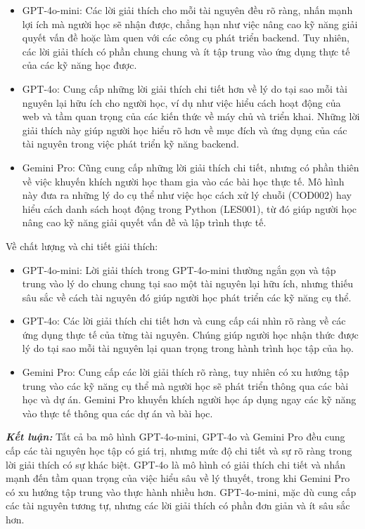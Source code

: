 \begin{itemize}
    \item GPT-4o-mini: Các lời giải thích cho mỗi tài nguyên đều rõ ràng, nhấn mạnh lợi ích mà người học sẽ nhận được, chẳng hạn như việc nâng cao kỹ năng giải quyết vấn đề hoặc làm quen với các công cụ phát triển backend. Tuy nhiên, các lời giải thích có phần chung chung và ít tập trung vào ứng dụng thực tế của các kỹ năng học được.
    \item GPT-4o: Cung cấp những lời giải thích chi tiết hơn về lý do tại sao mỗi tài nguyên lại hữu ích cho người học, ví dụ như việc hiểu cách hoạt động của web và tầm quan trọng của các kiến thức về máy chủ và triển khai. Những lời giải thích này giúp người học hiểu rõ hơn về mục đích và ứng dụng của các tài nguyên trong việc phát triển kỹ năng backend.
    \item Gemini Pro: Cũng cung cấp những lời giải thích chi tiết, nhưng có phần thiên về việc khuyến khích người học tham gia vào các bài học thực tế. Mô hình này đưa ra những lý do cụ thể như việc học cách xử lý chuỗi (COD002) hay hiểu cách danh sách hoạt động trong Python (LES001), từ đó giúp người học nâng cao kỹ năng giải quyết vấn đề và lập trình thực tế.
\end{itemize}
Về chất lượng và chi tiết giải thích:
\begin{itemize}
    \item GPT-4o-mini: Lời giải thích trong GPT-4o-mini thường ngắn gọn và tập trung vào lý do chung chung tại sao một tài nguyên lại hữu ích, nhưng thiếu sâu sắc về cách tài nguyên đó giúp người học phát triển các kỹ năng cụ thể.
    \item GPT-4o: Các lời giải thích chi tiết hơn và cung cấp cái nhìn rõ ràng về các ứng dụng thực tế của từng tài nguyên. Chúng giúp người học nhận thức được lý do tại sao mỗi tài nguyên lại quan trọng trong hành trình học tập của họ.
    \item Gemini Pro: Cung cấp các lời giải thích rõ ràng, tuy nhiên có xu hướng tập trung vào các kỹ năng cụ thể mà người học sẽ phát triển thông qua các bài học và dự án. Gemini Pro khuyến khích người học áp dụng ngay các kỹ năng vào thực tế thông qua các dự án và bài học.
\end{itemize}
\textbf{\textit{Kết luận:}} Tất cả ba mô hình GPT-4o-mini, GPT-4o và Gemini Pro đều cung cấp các tài nguyên học tập có giá trị, nhưng mức độ chi tiết và sự rõ ràng trong lời giải thích có sự khác biệt. GPT-4o là mô hình có giải thích chi tiết và nhấn mạnh đến tầm quan trọng của việc hiểu sâu về lý thuyết, trong khi Gemini Pro có xu hướng tập trung vào thực hành nhiều hơn. GPT-4o-mini, mặc dù cung cấp các tài nguyên tương tự, nhưng các lời giải thích có phần đơn giản và ít sâu sắc hơn.
